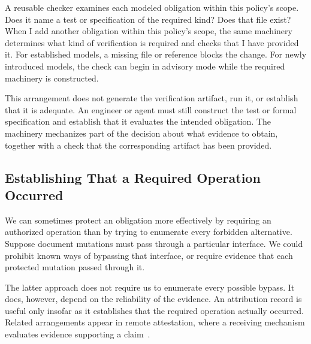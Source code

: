 A reusable checker examines each modeled obligation within this policy's scope. Does it name a test or specification of the required kind? Does that file exist? When I add another obligation within this policy's scope, the same machinery determines what kind of verification is required and checks that I have provided it. For established models, a missing file or reference blocks the change. For newly introduced models, the check can begin in advisory mode while the required machinery is constructed.

This arrangement does not generate the verification artifact, run it, or establish that it is adequate. An engineer or agent must still construct the test or formal specification and establish that it evaluates the intended obligation. The machinery mechanizes part of the decision about what evidence to obtain, together with a check that the corresponding artifact has been provided.


\subsection{Establishing That a Required Operation Occurred}\label{heading:establishing-that-a-required-operation-occurred}


We can sometimes protect an obligation more effectively by requiring an authorized operation than by trying to enumerate every forbidden alternative. Suppose document mutations must pass through a particular interface. We could prohibit known ways of bypassing that interface, or require evidence that each protected mutation passed through it.

The latter approach does not require us to enumerate every possible bypass. It does, however, depend on the reliability of the evidence. An attribution record is useful only insofar as it establishes that the required operation actually occurred. Related arrangements appear in remote attestation, where a receiving mechanism evaluates evidence supporting a claim~\citep{birkholz2023rats}.

